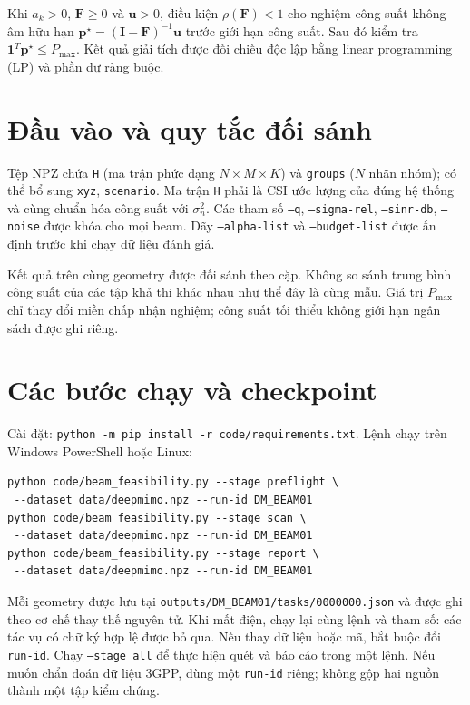 \documentclass[11pt,onecolumn]{IEEEtran}
\begin{document}
Khi $a_k>0$, $\mathbf F\geq0$ và $\mathbf u>0$, điều kiện $\rho(\mathbf F)<1$ cho nghiệm công suất không âm hữu hạn $\mathbf p^\star=(\mathbf I-\mathbf F)^{-1}\mathbf u$ trước giới hạn công suất. Sau đó kiểm tra $\mathbf1^T\mathbf p^\star\leq P_{\max}$. Kết quả giải tích được đối chiếu độc lập bằng linear programming (LP) và phần dư ràng buộc.
\section{Đầu vào và quy tắc đối sánh}
Tệp NPZ chứa \texttt{H} (ma trận phức dạng $N\times M\times K$) và \texttt{groups} ($N$ nhãn nhóm); có thể bổ sung \texttt{xyz}, \texttt{scenario}. Ma trận \texttt{H} phải là CSI ước lượng của đúng hệ thống và cùng chuẩn hóa công suất với $\sigma_n^2$. Các tham số \texttt{--q}, \texttt{--sigma-rel}, \texttt{--sinr-db}, \texttt{--noise} được khóa cho mọi beam. Dãy \texttt{--alpha-list} và \texttt{--budget-list} được ấn định trước khi chạy dữ liệu đánh giá.

Kết quả trên cùng geometry được đối sánh theo cặp. Không so sánh trung bình công suất của các tập khả thi khác nhau như thể đây là cùng mẫu. Giá trị $P_{\max}$ chỉ thay đổi miền chấp nhận nghiệm; công suất tối thiểu không giới hạn ngân sách được ghi riêng.
\section{Các bước chạy và checkpoint}
Cài đặt: \texttt{python -m pip install -r code/requirements.txt}. Lệnh chạy trên Windows PowerShell hoặc Linux:
\begin{verbatim}
python code/beam_feasibility.py --stage preflight \
 --dataset data/deepmimo.npz --run-id DM_BEAM01
python code/beam_feasibility.py --stage scan \
 --dataset data/deepmimo.npz --run-id DM_BEAM01
python code/beam_feasibility.py --stage report \
 --dataset data/deepmimo.npz --run-id DM_BEAM01
\end{verbatim}
Mỗi geometry được lưu tại \texttt{outputs/DM\_BEAM01/tasks/0000000.json} và được ghi theo cơ chế thay thế nguyên tử. Khi mất điện, chạy lại cùng lệnh và tham số: các tác vụ có chữ ký hợp lệ được bỏ qua. Nếu thay dữ liệu hoặc mã, bắt buộc đổi \texttt{run-id}. Chạy \texttt{--stage all} để thực hiện quét và báo cáo trong một lệnh. Nếu muốn chẩn đoán dữ liệu 3GPP, dùng một \texttt{run-id} riêng; không gộp hai nguồn thành một tập kiểm chứng.
\end{document}
